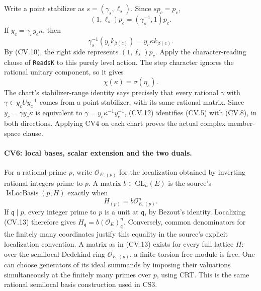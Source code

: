 \documentclass[11pt,a4paper]{article}
\numberwithin{equation}{section}
\theoremstyle{remark}\newtheorem{remark}[theorem]{Remark}
\begin{document}
Write a point stabilizer as \(s=(\gamma_s,\ell_s)\).
Since \(sp_c=p_c\),
\[
       (1,\ell_s)p_c=(\gamma_s^{-1},1)p_c.
\]
If \(y_c=\gamma_sy_c\kappa\), then
\[
       \gamma_s^{-1}(y_ck_{\beta(c)})
                     =y_c\kappa k_{\beta(c)}.
                                                               \tag{CV.11}
\]
By (CV.10), the right side represents
\((1,\ell_s)p_c\). Apply the character-reading clause of
\texttt{ReadsK} to this purely level action. The step
character ignores the rational unitary component, so it gives
\[
                    \chi(\kappa)=\sigma(\eta_s).              \tag{CV.12}
\]
The chart's stabilizer-range identity says precisely that
every rational \(\gamma\) with
\(\gamma\in y_cUy_c^{-1}\) comes from a point stabilizer,
with its same rational matrix. Since
\(y_c=\gamma y_c\kappa\) is equivalent to
\(\gamma=y_c\kappa^{-1}y_c^{-1}\), (CV.12) identifies
(CV.5) with (CV.8), in both directions. Applying CV4 on
each chart proves the actual complex member-space clause.

\paragraph{CV6: local bases, scalar extension and the two duals.}
For a rational prime \(p\), write \(\mathcal O_{E,(p)}\)
for the localization obtained by inverting rational integers
prime to \(p\). A matrix \(b\in\mathrm{GL}_n(E)\) is the
source's \(\operatorname{IsLocBasis}(p,H)\) exactly when
\[
                  H_{(p)}=b\mathcal O_{E,(p)}^n.              \tag{CV.13}
\]
If \(\mathfrak q\mid p\), every integer prime to \(p\) is a
unit at \(\mathfrak q\), by Bezout's identity. Localizing
(CV.13) therefore gives
\(H_{\mathfrak q}=b(\mathcal O_E)_{\mathfrak q}^n\).
Conversely, common denominators for the finitely many
coordinates justify this equality in the source's explicit
localization convention. A matrix as in (CV.13) exists for
every full lattice \(H\): over the semilocal Dedekind ring
\(\mathcal O_{E,(p)}\), a finite torsion-free module is free.
One can choose generators of its ideal summands by imposing
their valuations simultaneously at the finitely many primes
over \(p\), using CRT. This is the same rational semilocal
basis construction used in CS3.
\end{document}
